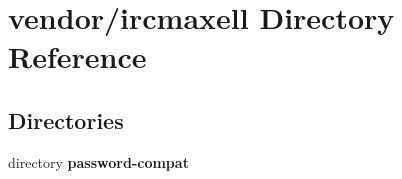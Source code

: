 \section{vendor/ircmaxell Directory Reference}
\label{dir_36e6f54e1e4150b0e0be609b633611a1}
\subsection*{Directories}
\begin{DoxyCompactItemize}
\item 
directory {\bf password-\/compat}
\end{DoxyCompactItemize}
